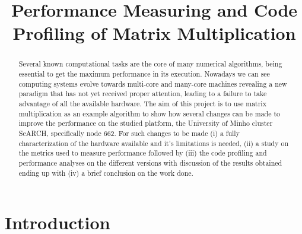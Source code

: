 \documentclass[conference]{IEEEtran}
\begin{document}
\title{ Performance Measuring and Code Profiling of Matrix Multiplication}


\author{
\and
{}
}


\maketitle


\begin{abstract}

Several known computational tasks are the core of many numerical algorithms, being essential to get the maximum performance in its execution. Nowadays we can see computing systems evolve towards multi-core and many-core machines revealing a new paradigm that has not yet received proper attention, leading to a failure to take advantage of all the available hardware. 
The aim of this project is to use matrix multiplication as an example algorithm to show how several changes can be made to improve the performance on the studied platform, the University of Minho cluster SeARCH, specifically node 662. For such changes to be made (i) a fully characterization of the hardware available and it's limitations is needed, (ii) a study on the metrics used to measure performance followed by (iii) the code profiling and performance analyses on the different versions with discussion of the results obtained ending up with (iv) a brief conclusion on the work done.
\end{abstract}


%
\IEEEpeerreviewmaketitle



\section{Introduction}
\end{document}
